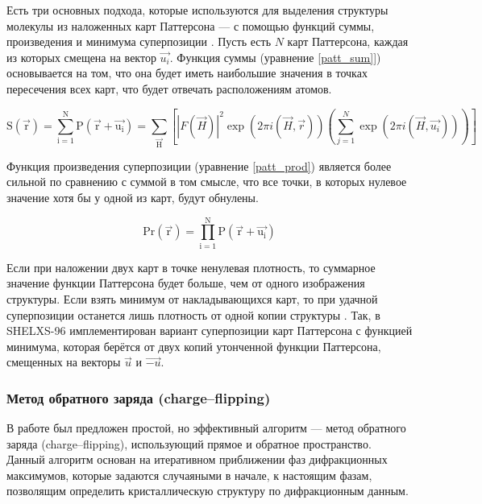 Есть три основных подхода, которые используются для выделения структуры молекулы из наложенных карт Паттерсона --- с помощью функций суммы, произведения и минимума суперпозиции \cite{rossmann_patterson_2001}. Пусть есть $N$ карт Паттерсона, каждая из которых смещена на вектор $\overrightarrow{u_i}$. Функция суммы (уравнение \ref{patt_sum}]) основывается на том, что она будет иметь наибольшие значения в точках пересечения всех карт, что будет отвечать расположениям атомов.

\begin{equation}\label{patt_sum}
	\mathrm{S(\overrightarrow{r}) = \sum\limits_{i=1}^N P(\overrightarrow{r}+\overrightarrow{u_i}) = \sum_{\overrightarrow{H}}}\left[|F(\overrightarrow{H})|^2 \exp (2\pi i (\overrightarrow{H}, \overrightarrow{r}))\left(\sum\limits_{j=1}^N\exp(2\pi i (\overrightarrow{H}, \overrightarrow{u_i}))\right)\right]
\end{equation}

Функция произведения суперпозиции (уравнение \ref{patt_prod}) является более сильной по сравнению с суммой в том смысле, что все точки, в которых нулевое значение хотя бы у одной из карт, будут обнулены.

\begin{equation}\label{patt_prod}
	\mathrm{Pr(\overrightarrow{r}) = \prod\limits_{i=1}^N P(\overrightarrow{r}+\overrightarrow{u_i})} 
\end{equation}
	
Если при наложении двух карт в точке ненулевая плотность, то суммарное значение функции Паттерсона будет больше, чем от одного изображения структуры. Если взять минимум от накладывающихся карт, то при удачной суперпозиции останется лишь плотность от одной копии структуры \cite{pavelcik_patterson-oriented_1992}. Так, в SHELXS-96 \cite{sheldrick_patterson_1997} имплементирован вариант суперпозиции карт Паттерсона с функцией минимума, которая берётся от двух копий утонченной функции Паттерсона, смещенных на векторы $\overrightarrow{u}$ и $\overrightarrow{-u}$.
	

\subsubsection{Метод обратного заряда (charge--flipping)}

В работе \cite{oszlanyi_ab_2004} был предложен простой, но эффективный алгоритм --- метод обратного заряда (charge--flipping), использующий прямое и обратное пространство. Данный алгоритм основан на итеративном приближении фаз дифракционных максимумов, которые задаются случаяными в начале, к настоящим фазам, позволящим определить кристаллическую структуру по дифракционным данным.

